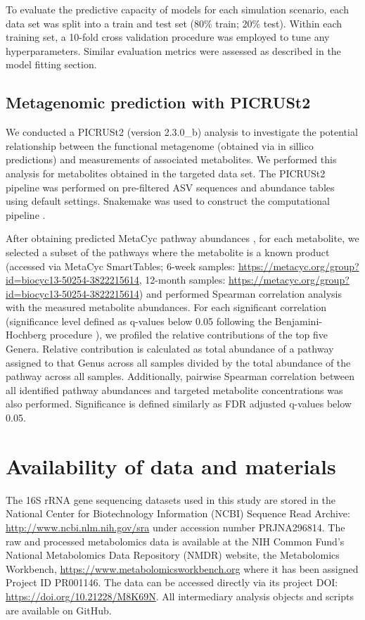 To evaluate the predictive capacity of models for each simulation scenario, each data set was split into a train and test set (80\% train; 20\% test). Within each training set, a 10-fold cross validation procedure was employed to tune any hyperparameters. Similar evaluation metrics were assessed as described in the model fitting section. 

\subsection{Metagenomic prediction with PICRUSt2}

We conducted a PICRUSt2 (version 2.3.0\_b) \cite{douglas2020picrust2} analysis to investigate the potential relationship between the functional metagenome (obtained via in sillico predictions) and measurements of associated metabolites. We performed this analysis for metabolites obtained in the targeted data set. The PICRUSt2 pipeline was performed on pre-filtered ASV sequences and abundance tables using default settings. Snakemake was used to construct the computational pipeline \cite{molder2021sustainable}.  

After obtaining predicted MetaCyc pathway abundances \cite{caspi2020metacyc}, for each metabolite, we selected a subset of the pathways where the metabolite is a known product (accessed via MetaCyc SmartTables; 6-week samples: \url{https://metacyc.org/group?id=biocyc13-50254-3822215614}, 12-month samples: \url{https://metacyc.org/group?id=biocyc13-50254-3822215614}) and performed Spearman correlation analysis with the measured metabolite abundances. For each significant correlation (significance level defined as q-values below 0.05 following the Benjamini-Hochberg procedure \cite{benjamini1995controlling}), we profiled the relative contributions of the top five Genera. Relative contribution is calculated as total abundance of a pathway assigned to that Genus across all samples divided by the total abundance of the pathway across all samples. 
Additionally, pairwise Spearman correlation between all identified pathway abundances and targeted metabolite concentrations was also performed. Significance is defined similarly as FDR adjusted q-values below 0.05.    

\section{Availability of data and materials}

The 16S rRNA gene sequencing datasets used in this study are stored in the National Center for Biotechnology Information (NCBI) Sequence Read Archive: \url{http://www.ncbi.nlm.nih.gov/sra} under accession number PRJNA296814. The raw and processed metabolomics data is available at the NIH Common Fund's National Metabolomics Data Repository (NMDR) website, the Metabolomics Workbench, \url{https://www.metabolomicsworkbench.org} where it has been assigned Project ID PR001146. The data can be accessed directly via its project DOI: \url{https://doi.org/10.21228/M8K69N}. All intermediary analysis objects and scripts are available on GitHub. 

